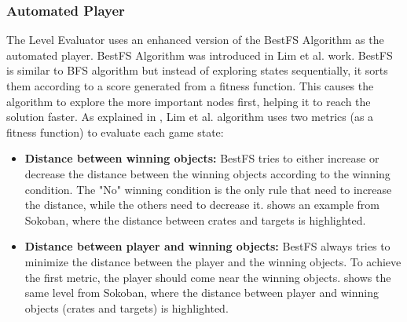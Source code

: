 \subsubsection{Automated Player}
The Level Evaluator uses an enhanced version of the BestFS Algorithm as the automated player. BestFS Algorithm was introduced in Lim et al.\cite{puzzleScriptGeneration} work. BestFS is similar to BFS algorithm but instead of exploring states sequentially, it sorts them according to a score generated from a fitness function. This causes the algorithm to explore the more important nodes first, helping it to reach the solution faster. As explained in , Lim et al. algorithm uses two metrics (as a fitness function) to evaluate each game state:
\begin{itemize} \itemsep0pt \parskip0pt 
	\item \textbf{Distance between winning objects:} BestFS tries to either increase or decrease the distance between the winning objects according to the winning condition. The "No" winning condition is the only rule that need to increase the distance, while the others need to decrease it.  shows an example from Sokoban, where the distance between crates and targets is highlighted.
	\item \textbf{Distance between player and winning objects:} BestFS always tries to minimize the distance between the player and the winning objects. To achieve the first metric, the player should come near the winning objects.  shows the same level from Sokoban, where the distance between player and winning objects (crates and targets) is highlighted.
\end{itemize}

